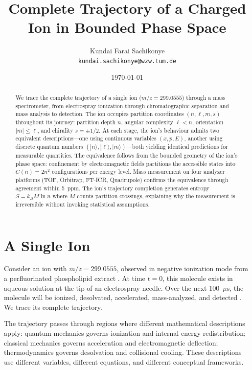 \documentclass[twocolumn,10pt]{article}
\title{\textbf{Complete Trajectory of a Charged Ion in Bounded Phase Space}}
\author{
Kundai Farai Sachikonye\\
\texttt{kundai.sachikonye@wzw.tum.de}
}
\date{\today}
\theoremstyle{remark}
\begin{document}
\maketitle

\begin{abstract}
We trace the complete trajectory of a single ion ($m/z = 299.0555$) through a mass spectrometer, from electrospray ionization through chromatographic separation and mass analysis to detection. The ion occupies partition coordinates $(n, \ell, m, s)$ throughout its journey: partition depth $n$, angular complexity $\ell < n$, orientation $|m| \leq \ell$, and chirality $s = \pm 1/2$. At each stage, the ion's behaviour admits two equivalent descriptions---one using continuous variables $(x, p, E)$, another using discrete quantum numbers $(|n\rangle, |\ell\rangle, |m\rangle)$---both yielding identical predictions for measurable quantities. The equivalence follows from the bounded geometry of the ion's phase space: confinement by electromagnetic fields partitions the accessible states into $C(n) = 2n^2$ configurations per energy level. Mass measurement on four analyzer platforms (TOF, Orbitrap, FT-ICR, Quadrupole) confirms the equivalence through agreement within 5~ppm. The ion's trajectory completion generates entropy $S = k_B M \ln n$ where $M$ counts partition crossings, explaining why the measurement is irreversible without invoking statistical assumptions.
\end{abstract}



\section{A Single Ion}
\label{sec:single-ion}

Consider an ion with $m/z = 299.0555$, observed in negative ionization mode from a perfluorinated phospholipid extract \cite{gross2017mass,hoffmann2007mass}. At time $t = 0$, this molecule exists in aqueous solution at the tip of an electrospray needle. Over the next 100~$\mu$s, the molecule will be ionized, desolvated, accelerated, mass-analyzed, and detected \cite{thomson1913rays,aston1919constitution}. We trace its complete trajectory.

The trajectory passes through regions where different mathematical descriptions apply: quantum mechanics governs ionization and internal energy redistribution; classical mechanics governs acceleration and electromagnetic deflection; thermodynamics governs desolvation and collisional cooling. These descriptions use different variables, different equations, and different conceptual frameworks.
\end{document}
